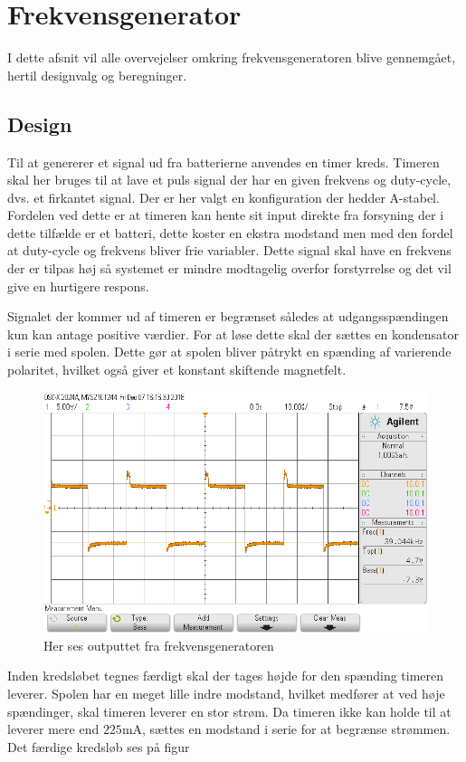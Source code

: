\section{Frekvensgenerator}\label{sec:frekv_gen}
I dette afsnit vil alle overvejelser omkring frekvensgeneratoren blive gennemgået, hertil designvalg og beregninger. 
\subsection{Design}
Til at genererer et signal ud fra batterierne anvendes en timer kreds. 
Timeren skal her bruges til at lave et puls signal der har en given frekvens og duty-cycle, dvs. et firkantet signal. 
Der er her valgt en konfiguration der hedder A-stabel. 
Fordelen ved dette er at timeren kan hente sit input direkte fra forsyning der i dette tilfælde er et batteri, dette koster en ekstra modstand men med den fordel at duty-cycle og frekvens bliver frie variabler. 
Dette signal skal have en frekvens der er tilpas høj så systemet er mindre modtagelig overfor forstyrrelse og det vil give en hurtigere respons. 

Signalet der kommer ud af timeren er begrænset således at udgangsspændingen kun kan antage positive værdier.
For at løse dette skal der sættes en kondensator i serie med spolen.
Dette gør at spolen bliver påtrykt en spænding af varierende polaritet, hvilket også giver et konstant skiftende magnetfelt.
\begin{figure}[h!]
	\centering
	\includegraphics[width=1\textwidth]{billeder/freq_png.png}
	\caption{Her ses outputtet fra frekvensgeneratoren}
	\label{fig:frekvensgenerator}
\end{figure}
Inden kredsløbet tegnes færdigt skal der tages højde for den spænding timeren leverer. 
Spolen har en meget lille indre modstand, hvilket medfører at ved høje spændinger, skal timeren leverer en stor strøm. 
Da timeren ikke kan holde til at leverer mere end $225 \si{\milli\ampere}$, sættes en modstand i serie for at begrænse strømmen. 
Det færdige kredsløb ses på figur 

